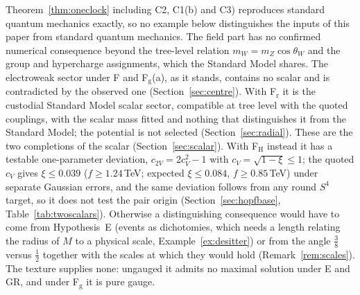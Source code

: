 \documentclass[aps,pra,onecolumn,superscriptaddress,nofootinbib,10pt]{revtex4-2}
\theoremstyle{definition}
\theoremstyle{remark}
\begin{document}
Theorem~\ref{thm:oneclock} including C2, C1(b) and C3) reproduces standard quantum mechanics exactly, so no example below distinguishes the inputs
of this paper from standard quantum mechanics.  The field part has no confirmed numerical consequence
beyond the tree-level relation $m_W=m_Z\cos\theta_W$ and the group and hypercharge assignments, which the
Standard Model shares.  The electroweak sector under F and F$_{\mathrm g}$(a), as it stands, contains no scalar and is contradicted by
the observed one (Section~\ref{sec:centre}).  With F$_{\mathrm r}$ it is the custodial Standard Model scalar sector,
compatible at tree level with the quoted couplings, with the scalar mass fitted and nothing that
distinguishes it from the Standard Model; the potential is not selected (Section~\ref{sec:radial}).  These are the two
completions of the scalar (Section~\ref{sec:scalar}).  With F$_{\mathrm H}$
instead it has a testable one-parameter deviation, $c_{2V}=2c_V^2-1$ with $c_V=\sqrt{1-\xi}\le1$; the quoted $c_V$ gives
$\xi\le0.039$ ($f\ge1.24$\,TeV; expected $\xi\le0.084$, $f\ge0.85$\,TeV) under separate Gaussian errors, and the same deviation follows from any round
$S^4$ target, so it does not test the pair origin (Section~\ref{sec:hopfbase}, Table~\ref{tab:twoscalars}).  Otherwise a
distinguishing consequence would have to come from Hypothesis~E (events as
dichotomies, which needs a length relating the radius of $M$ to a physical scale, Example~\ref{ex:desitter})
or from the angle $\tfrac38$ versus $\tfrac12$ together with the scales at which they would hold
(Remark~\ref{rem:scales}).  The texture supplies none: ungauged it admits no maximal solution under E and
GR, and under F$_{\mathrm g}$ it is pure gauge.
\end{document}
